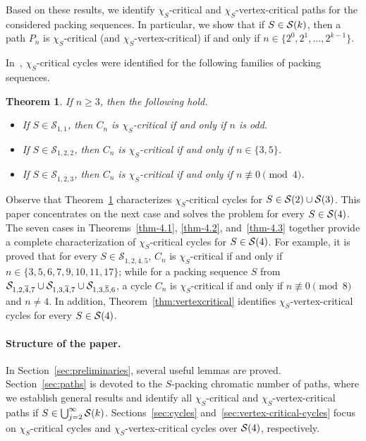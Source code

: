 \documentclass[12pt]{article}
\newtheorem{theorem}{Theorem}[section]
\newcommand{\cS}{{\cal S}}
\begin{document}
Based on these results, we identify  $\chi_S$-critical and $\chi_S$-vertex-critical paths for the considered packing sequences. In particular, we show that  if $S \in \cS(k)$, then a path $P_n$ is $\chi_S$-critical (and $\chi_S$-vertex-critical) if and only if $n \in \{2^0, 2^1, \dots, 2^{k-1}\}$.
\medskip

In~\cite{ekinci-2026}, $\chi_S$-critical cycles were identified for the following families of packing sequences.
\begin{theorem}{\rm \cite{ekinci-2026}}
\label{thm1}
	If $n \ge 3$, then the following hold.
	\begin{itemize}
		\item[(i)] If $S \in \mathcal{S}_{1,1}$, then $C_n$ is $\chi_S$-critical if and only if $n$ is odd.
		
		\item[(ii)] If $S \in \mathcal{S}_{1,2,2}$, then $C_n$ is $\chi_S$-critical if and only if $n \in \{3,5\}$.
		
		\item[(iii)] If $S \in \mathcal{S}_{1,\overline{2},3}$, then $C_n$ is $\chi_S$-critical if and only if $n \not\equiv 0 \pmod{4}$.
	\end{itemize}
\end{theorem}
Observe that Theorem~\ref{thm1} characterizes $\chi_S$-critical cycles for $S \in \cS(2)\cup \cS(3)$. This paper concentrates on the next case and solves the problem for every $S \in \cS(4)$.
The seven cases in Theorems~\ref{thm-4.1}, \ref{thm-4.2}, and~\ref{thm-4.3} together provide a complete characterization of $\chi_S$-critical  cycles for $S \in \cS(4)$. For example, it is proved that for every $S \in \mathcal{S}_{1,2,\overline{4},5}$,  $C_n$ is $\chi_S$-critical if and only if $n \in \{3, 5, 6, 7, 9, 10, 11,\allowbreak 17\}$; while for a packing sequence $S$ from $\mathcal{S}_{1,2,\overline{4},7} \cup \cS_{1,3,\overline{4},7} \cup \cS_{1,3,\overline{5}, 6}$, a cycle $C_n$ is $\chi_S$-critical if and only if   $n \not\equiv 0 \pmod{8}$ and $n \neq 4$. In addition, Theorem~\ref{thm:vertexcritical} identifies $\chi_S$-vertex-critical cycles for every $S \in \cS(4)$.


\paragraph{Structure of the paper.} 
In Section~\ref{sec:preliminaries}, several useful lemmas are proved.
Section~\ref{sec:paths} is devoted to the $S$-packing chromatic number of paths, where we establish general results and identify all $\chi_S$-critical and $\chi_S$-vertex-critical paths if $S \in \bigcup_{j=2}^\infty \cS(k)$. Sections~\ref{sec:cycles} and~\ref{sec:vertex-critical-cycles} focus on $\chi_S$-critical cycles and $\chi_S$-vertex-critical cycles over $\cS(4)$, respectively. 
\end{document}
